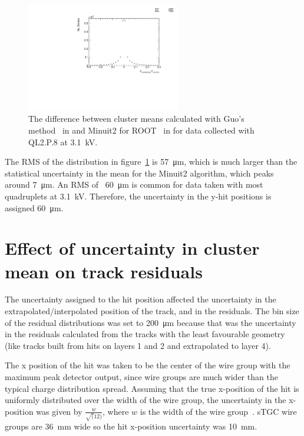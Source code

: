 \begin{figure}
    \centering
    \includegraphics[width = 0.6\textwidth]{figures/figure_QL2P08_3100V_2021-05-21_reclustering_plots_mu_reclustering_minus_mu_cosmics.pdf}
    \caption{The difference between cluster means calculated with Guo's method~\cite{guo_simple_2011} in  and Minuit2 for ROOT~\cite{hatlo_developments_2005} in  for data collected with QL2.P.8 at 3.1~kV.}
    \label{fig:mu_reclustering_minus_mu_cosmics}
\end{figure}

The RMS of the distribution in figure~\ref{fig:mu_reclustering_minus_mu_cosmics} is \SI{57}{\micro\meter}, which is much larger than the statistical uncertainty in the mean for the Minuit2 algorithm, which peaks around \SI{7}{\micro\meter}. An RMS of ~\SI{60}{\micro\meter} is common for data taken with most quadruplets at 3.1~kV. Therefore, the uncertainty in the y-hit positions is assigned \SI{60}{\micro\meter}.

\section{Effect of uncertainty in cluster mean on track residuals}
\label{sec:appendix_clustering_track_residuals}
The uncertainty assigned to the hit position affected the uncertainty in the extrapolated/interpolated position of the track, and in the residuals. The bin size of the residual distributions was set to \SI{200}{\micro\meter} because that was the uncertainty in the residuals calculated from the tracks with the least favourable geometry (like tracks built from hits on layers 1 and 2 and extrapolated to layer 4). 

The x position of the hit was taken to be the center of the wire group with the maximum peak detector output, since wire groups are much wider than the typical charge distribution spread. Assuming that the true x-position of the hit is uniformly distributed over the width of the wire group, the uncertainty in the x-position was given by $\frac{w}{\sqrt(12)}$, where $w$ is the width of the wire group~\cite{Sauli:117989}. sTGC wire groups are \SI{36}{\milli\meter} wide so the hit x-position uncertainty was \SI{10}{\milli\meter}.